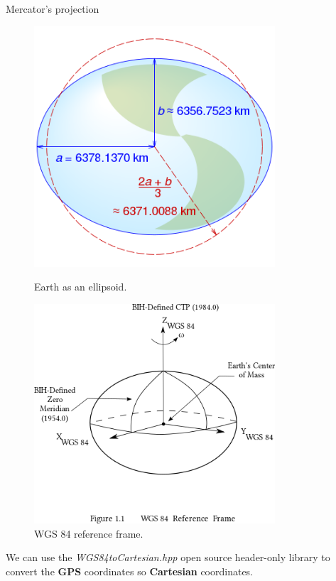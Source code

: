 \documentclass[10pt]{beamer}
\begin{document}
\begin{frame}{Mercator's projection}
  \begin{figure}[H]
    \centering
    \begin{minipage}{0.49\textwidth}
        \centering
        \includegraphics[width=0.8\textwidth]{images/WGS84_mean_Earth_radius.svg.png}
        \caption{Earth as an ellipsoid\cite{mercator-wiki}.}
    \end{minipage}\hfill
    \begin{minipage}{0.49\textwidth}
        \centering
        \includegraphics[width=0.8\textwidth]{images/WGS_84_reference_frame.png}
        \caption{WGS 84 reference frame\cite{mercator-wiki}.}
    \end{minipage}
\end{figure}

We can use the \textit{WGS84toCartesian.hpp}\cite{wgs84_to_cartesian} open source header-only
  library to convert the \textbf{GPS} coordinates so \textbf{Cartesian} coordinates.
\end{frame}
\end{document}
